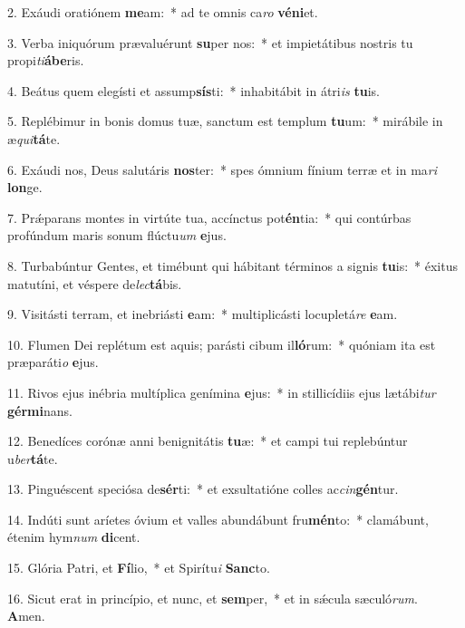 2. Exáudi oratiónem \textbf{me}am:~*  ad te omnis ca\textit{ro} \textbf{vé}\textbf{ni}et.\

3. Verba iniquórum prævaluérunt \textbf{su}per nos:~*  et impietátibus nostris tu propi\textit{ti}\textbf{á}\textbf{be}ris.\

4. Beátus quem elegísti et assump\textbf{sís}ti:~*  inhabitábit in átri\textit{is} \textbf{tu}is.\

5. Replébimur in bonis domus tuæ, sanctum est templum \textbf{tu}um:~*  mirábile in æ\textit{qui}\textbf{tá}te.\

6. Exáudi nos, Deus salutáris \textbf{nos}ter:~*  spes ómnium fínium terræ et in ma\textit{ri} \textbf{lon}ge.\

7. Prǽparans montes in virtúte tua, accínctus pot\textbf{én}tia:~*  qui contúrbas profúndum maris sonum flúctu\textit{um} \textbf{e}jus.\

8. Turbabúntur Gentes, et timébunt qui hábitant términos a signis \textbf{tu}is:~*  éxitus matutíni, et véspere de\textit{lec}\textbf{tá}bis.\

9. Visitásti terram, et inebriásti \textbf{e}am:~*  multiplicásti locupletá\textit{re} \textbf{e}am.\

10. Flumen Dei replétum est aquis; parásti cibum il\textbf{ló}rum:~*  quóniam ita est præparáti\textit{o} \textbf{e}jus.\

11. Rivos ejus inébria multíplica genímina \textbf{e}jus:~*  in stillicídiis ejus lætábi\textit{tur} \textbf{gér}\textbf{mi}nans.\

12. Benedíces corónæ anni benignitátis \textbf{tu}æ:~*  et campi tui replebúntur u\textit{ber}\textbf{tá}te.\

13. Pinguéscent speciósa de\textbf{sér}ti:~*  et exsultatióne colles ac\textit{cin}\textbf{gén}tur.\

14. Indúti sunt aríetes óvium et valles abundábunt fru\textbf{mén}to:~*  clamábunt, étenim hym\textit{num} \textbf{di}cent.\

15. Glória Patri, et \textbf{Fí}lio,~*  et Spirítu\textit{i} \textbf{Sanc}to.\

16. Sicut erat in princípio, et nunc, et \textbf{sem}per,~*  et in sǽcula sæculó\textit{rum}. \textbf{A}men.\

